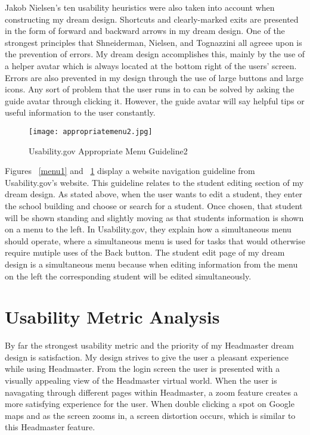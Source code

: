 \documentclass[11pt]{article}
\begin{document}
Jakob Nielsen's ten usability heuristics \cite{usability} were also taken into account when constructing my dream design. Shortcuts and clearly-marked exits are presented in the form of forward and backward arrows in my dream design. One of the strongest principles that Shneiderman, Nielsen, and Tognazzini all agreee upon is the prevention of errors. My dream design accomplishes this, mainly by the use of a helper avatar which is always located at the bottom right of the users' screen. Errors are also prevented in my design through the use of large buttons and large icons. Any sort of problem that the user runs in to can be solved by asking the guide avatar through clicking it. However, the guide avatar will say helpful tips or useful information to the user constantly.


\begin{figure}[h]
\centering
\texttt{[image: appropriatemenu2.jpg]}
\caption{Usability.gov Appropriate Menu Guideline2}
\label{menu2}
\end{figure}

Figures  ~\ref{menu1} and ~\ref{menu2} display a website navigation guideline from Usability.gov's website. This guideline relates to the student editing section of my dream design. As stated above, when the user wants to edit a student, they enter the school building and choose or search for a student. Once chosen, that student will be shown standing and slightly moving as that students information is shown on a menu to the left. In Usability.gov, they explain how a simultaneous menu should operate, where a simultaneous menu is used for tasks that would otherwise require mutiple uses of the Back button. The student edit page of my dream design is a simultaneous menu because when editing information from the menu on the left the corresponding student will be edited simultaneously. 



\section{Usability Metric Analysis}
By far the strongest usability metric and the priority of my Headmaster dream design is satisfaction. My design strives to give the user a pleasant experience while using Headmaster. From the login screen the user is presented with a visually appealing view of the Headmaster virtual world. When the user is navagating through different pages within Headmaster, a zoom feature creates a more satisfying experience for the user. When double clicking a spot on Google maps and as the screen zooms in, a screen distortion occurs, which is similar to this Headmaster feature.
\end{document}
